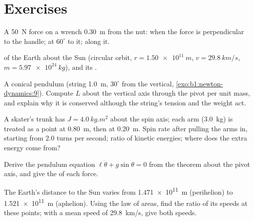 \section{Exercises}

\begin{exercise}[$\star$]\label{exo:b1:angular-momentum:1}
A \qty{50}{N} force on a wrench \qty{0.30}{m} from the nut:  when
the force is perpendicular to the handle; at $60^\circ$ to it; along
it.
\end{exercise}

\begin{exercise}[$\star$]\label{exo:b1:angular-momentum:2}
 of the Earth about the Sun (circular orbit,
$r = \qty{1.50e11}{m}$, $v = \qty{29.8}{km/s}$, $m = \qty{5.97e24}{kg}$),
and its .
\end{exercise}

\begin{exercise}[$\star$]\label{exo:b1:angular-momentum:3}
A conical pendulum (string \qty{1.0}{m}, $30^\circ$ from the vertical,
\cref{exo:b1:newton-dynamics:9}). Compute $L$ about the vertical axis
through the pivot per unit mass, and explain why it is conserved
although the string's tension and the weight act.
\end{exercise}

\begin{exercise}[$\star$]\label{exo:b1:angular-momentum:4}
A skater's trunk has $J = \qty{4.0}{kg.m^2}$ about the spin axis; each
arm (\qty{3.0}{kg}) is treated as a point at \qty{0.80}{m}, then at
\qty{0.20}{m}. Spin rate after pulling the arms in, starting from
\qty{2.0}{} turns per second; ratio of kinetic energies; where does the
extra energy come from?
\end{exercise}

\begin{exercise}[$\star\star$]\label{exo:b1:angular-momentum:5}
Derive the pendulum equation $\ell\ddot\theta + g\sin\theta = 0$ from the
 theorem about the pivot axis, and give the  of
each force.
\end{exercise}

\begin{exercise}[$\star\star$]\label{exo:b1:angular-momentum:6}
The Earth's distance to the Sun varies from \qty{1.471e11}{m} (perihelion)
to \qty{1.521e11}{m} (aphelion). Using the law of areas, find the ratio
of its speeds at these points; with a mean speed of \qty{29.8}{km/s},
give both speeds.
\end{exercise}

